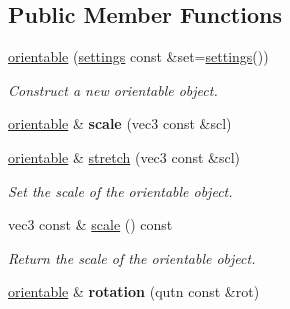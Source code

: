 \subsection*{Public Member Functions}
\begin{DoxyCompactItemize}
\item 
\hypertarget{classgfx_1_1orientable_a053f20c5e02879540199c0e232636d0b}{\hyperlink{classgfx_1_1orientable_a053f20c5e02879540199c0e232636d0b}{orientable} (\hyperlink{classgfx_1_1orientable_1_1settings}{settings} const \&set=\hyperlink{classgfx_1_1orientable_1_1settings}{settings}())}\label{classgfx_1_1orientable_a053f20c5e02879540199c0e232636d0b}

\begin{DoxyCompactList}\small\item\em Construct a new orientable object. \end{DoxyCompactList}\item 
\hypertarget{classgfx_1_1orientable_a88fbeffe72a67ff7169ab2aea6109e6c}{\hyperlink{classgfx_1_1orientable}{orientable} \& {\bfseries scale} (vec3 const \&scl)}\label{classgfx_1_1orientable_a88fbeffe72a67ff7169ab2aea6109e6c}

\item 
\hyperlink{classgfx_1_1orientable}{orientable} \& \hyperlink{classgfx_1_1orientable_abbddb58aba9e2b1d2011cc5d8b289e7a}{stretch} (vec3 const \&scl)
\begin{DoxyCompactList}\small\item\em Set the scale of the orientable object. \end{DoxyCompactList}\item 
vec3 const \& \hyperlink{classgfx_1_1orientable_a1a4029fefd371cb0d54b1ba279824223}{scale} () const 
\begin{DoxyCompactList}\small\item\em Return the scale of the orientable object. \end{DoxyCompactList}\item 
\hypertarget{classgfx_1_1orientable_a9b65cffc474e9939879af5cebff5c193}{\hyperlink{classgfx_1_1orientable}{orientable} \& {\bfseries rotation} (qutn const \&rot)}\label{classgfx_1_1orientable_a9b65cffc474e9939879af5cebff5c193}


\end{DoxyCompactItemize}
